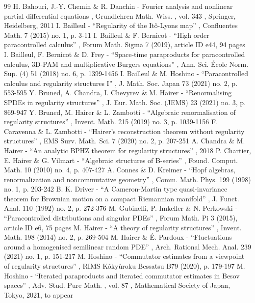 \documentclass[11pt]{article}
\numberwithin{equation}{section}
\theoremstyle{plain}
\theoremstyle{definition}
\begin{document}
\begin{thebibliography}{99}
 H. Bahouri, J.-Y. Chemin \& R. Danchin - Fourier analysis and nonlinear partial differential equations , Grundlehren Math. Wiss. , vol. 343 , Springer, Heidelberg, 2011
 I. Bailleul - “Regularity of the Itô-Lyons map” , Confluentes Math. 7 (2015) no. 1, p. 3-11
 I. Bailleul \& F. Bernicot - “High order paracontrolled calculus” , Forum Math. Sigma 7 (2019), article ID e44, 94 pages
 I. Bailleul, F. Bernicot \& D. Frey - “Space-time paraproducts for paracontrolled calculus, 3D-PAM and multiplicative Burgers equations” , Ann. Sci. École Norm. Sup. (4) 51 (2018) no. 6, p. 1399-1456
 I. Bailleul \& M. Hoshino - “Paracontrolled calculus and regularity structures I” , J. Math. Soc. Japan 73 (2021) no. 2, p. 553-595
 Y. Bruned, A. Chandra, I. Chevyrev \& M. Hairer - “Renormalising SPDEs in regularity structures” , J. Eur. Math. Soc. (JEMS) 23 (2021) no. 3, p. 869-947
 Y. Bruned, M. Hairer \& L. Zambotti - “Algebraic renormalisation of regularity structures” , Invent. Math. 215 (2019) no. 3, p. 1039-1156
 F. Caravenna \& L. Zambotti - “Hairer’s reconstruction theorem without regularity structures” , EMS Surv. Math. Sci. 7 (2020) no. 2, p. 207-251
 A. Chandra \& M. Hairer - “An analytic BPHZ theorem for regularity structures” , 2018
 P. Chartier, E. Hairer \& G. Vilmart - “Algebraic structures of B-series” , Found. Comput. Math. 10 (2010) no. 4, p. 407-427
 A. Connes \& D. Kreimer - “Hopf algebras, renormalization and noncommutative geometry” , Comm. Math. Phys. 199 (1998) no. 1, p. 203-242
 B. K. Driver - “A Cameron-Martin type quasi-invariance theorem for Brownian motion on a compact Riemannian manifold” , J. Funct. Anal. 110 (1992) no. 2, p. 272-376
 M. Gubinelli, P. Imkeller \& N. Perkowski - “Paracontrolled distributions and singular PDEs” , Forum Math. Pi 3 (2015), article ID e6, 75 pages
 M. Hairer - “A theory of regularity structures” , Invent. Math. 198 (2014) no. 2, p. 269-504
 M. Hairer \& É. Pardoux - “Fluctuations around a homogenised semilinear random PDE” , Arch. Rational Mech. Anal. 239 (2021) no. 1, p. 151-217
 M. Hoshino - “Commutator estimates from a viewpoint of regularity structures” , RIMS Kôkyûroku Bessatsu B79 (2020), p. 179-197
 M. Hoshino - “Iterated paraproducts and iterated commutator estimates in Besov spaces” , Adv. Stud. Pure Math. , vol. 87 , Mathematical Society of Japan, Tokyo, 2021, to appear

\end{thebibliography}
\end{document}
